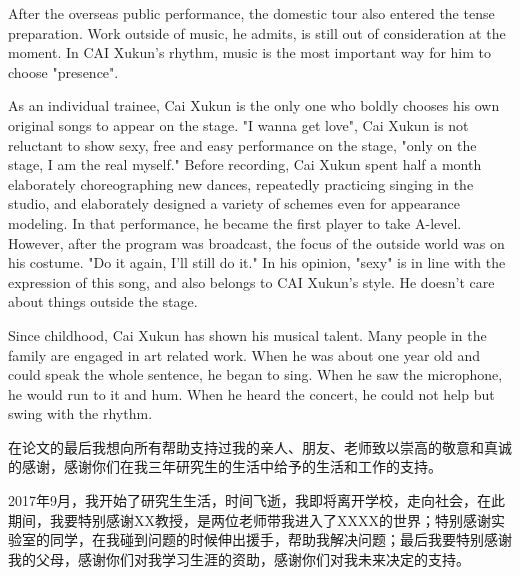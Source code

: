 \documentclass[pdf,count]{oucthesis}
\begin{document}
\begin{enabstract}
After the overseas public performance, the domestic tour also entered the tense preparation. Work outside of music, he admits, is still out of consideration at the moment. In CAI Xukun's rhythm, music is the most important way for him to choose "presence".



As an individual trainee, Cai Xukun is the only one who boldly chooses his own original songs to appear on the stage. "I wanna get love", Cai Xukun is not reluctant to show sexy, free and easy performance on the stage, "only on the stage, I am the real myself." Before recording, Cai Xukun spent half a month elaborately choreographing new dances, repeatedly practicing singing in the studio, and elaborately designed a variety of schemes even for appearance modeling. In that performance, he became the first player to take A-level. However, after the program was broadcast, the focus of the outside world was on his costume. "Do it again, I'll still do it." In his opinion, "sexy" is in line with the expression of this song, and also belongs to CAI Xukun's style. He doesn't care about things outside the stage.



Since childhood, Cai Xukun has shown his musical talent. Many people in the family are engaged in art related work. When he was about one year old and could speak the whole sentence, he began to sing. When he saw the microphone, he would run to it and hum. When he heard the concert, he could not help but swing with the rhythm.

\end{enabstract}

\tableofcontents

\mainmatter










\begin{ackonwlegmentback}
在论文的最后我想向所有帮助支持过我的亲人、朋友、老师致以崇高的敬意和真诚的感谢，感谢你们在我三年研究生的生活中给予的生活和工作的支持。

2017年9月，我开始了研究生生活，时间飞逝，我即将离开学校，走向社会，在此期间，我要特别感谢XX教授，是两位老师带我进入了XXXX的世界；特别感谢实验室的同学，在我碰到问题的时候伸出援手，帮助我解决问题；最后我要特别感谢我的父母，感谢你们对我学习生涯的资助，感谢你们对我未来决定的支持。    
\end{ackonwlegmentback}
\end{document}
